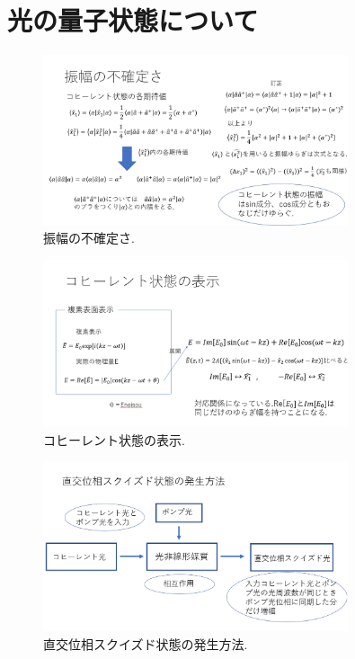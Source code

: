 \renewcommand{\prechaptername}{付録}
\renewcommand{\postchaptername}{}
\renewcommand{\thechapter}{\Alph{chapter}}

\chapter{光の量子状態について}


\begin{figure}[htbp]
        \centering   
        \includegraphics[width=0.8\textwidth]{img/zemi20.png}
        \caption[sample image (png)]{振幅の不確定さ.}
        \label{Fig:1_7_5}
    \end{figure}
    
\begin{figure}[htbp]
        \centering   
        \includegraphics[width=0.8\textwidth]{img/zemi21.png}
        \caption[sample image (png)]{コヒーレント状態の表示.}
        \label{Fig:1_7_6}
    \end{figure}
    
\begin{figure}[htbp]
        \centering   
        \includegraphics[width=0.8\textwidth]{img/zemi22.png}
        \caption[sample image (png)]{直交位相スクイズド状態の発生方法.}
        \label{Fig:1_7_7}
    \end{figure}